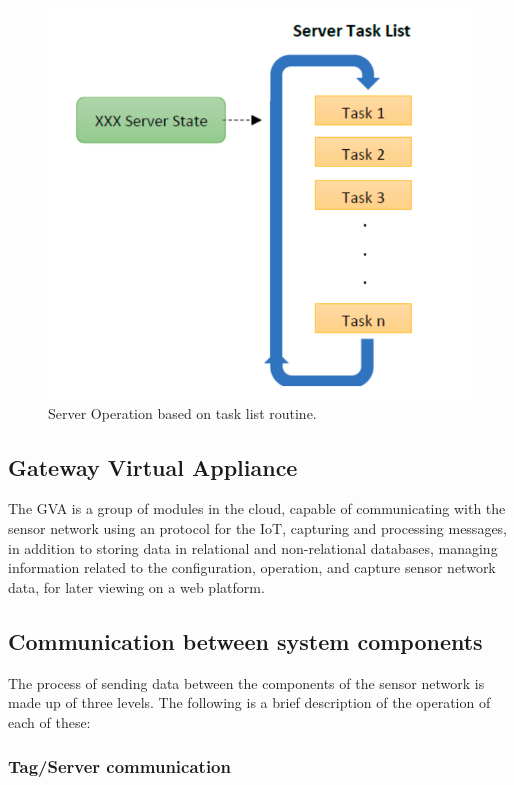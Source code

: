 \documentclass[journal]{IEEEtran}	%
\begin{document}
\begin{figure}[H]
\centering
\includegraphics[width=0.8\columnwidth]{fig8.png}
\caption{Server Operation based on task list routine.}
\label{fig:server_tasks}
\end{figure}

\subsection{Gateway  Virtual  Appliance}

The GVA is a group of modules in the cloud, capable of communicating with the sensor network using an protocol for the IoT, capturing and processing messages, in addition to storing data in relational and non-relational databases, managing information related to the configuration, operation, and capture sensor network data, for later viewing on a web platform. \\

\subsection{Communication between system components}

The process of sending data between the components of the sensor network is made up of three levels. The following is a brief description of the operation of each of these: \\

\subsubsection{Tag/Server communication}
\label{sub:tag_server}
\end{document}
